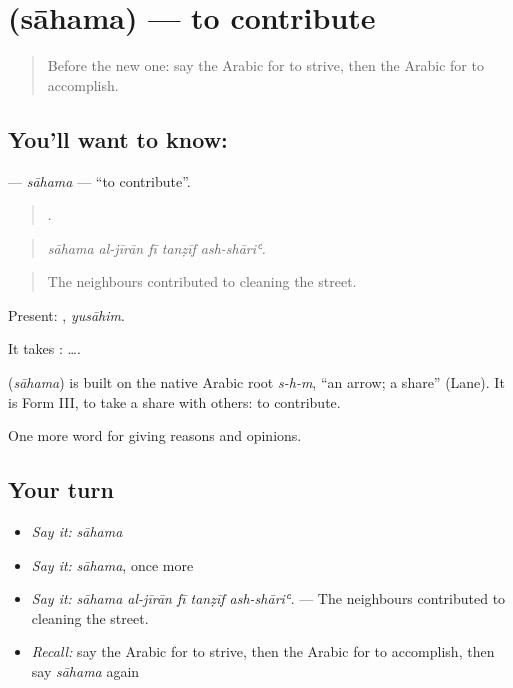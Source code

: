 \section[\texorpdfstring{\ar{ساهم} (sāhama)}{ساهم (sāhama)}]{ (sāhama) — to contribute}

\label{lesson:AR-C371-sahama}



\begin{quote}
Before the new one: say the Arabic for to strive, then the Arabic for to accomplish.
\end{quote}

\subsection*{You'll want to know: }
\textbf{} — \emph{sāhama} — \textquotedblleft{}to contribute\textquotedblright{}.

\begin{quote}
    .
\end{quote}

\begin{quote}
\emph{sāhama al-jīrān fī tanẓīf ash-shāriʿ.}
\end{quote}

\begin{quote}
The neighbours contributed to cleaning the street.
\end{quote}

Present: , \emph{yusāhim}.

It takes :   ….

\begin{cousinweb}
\textbf{} (\emph{sāhama}) is built on the native Arabic root \emph{s-h-m}, \textquotedblleft{}an arrow; a share\textquotedblright{} (Lane). It is Form III, to take a share with others: to contribute.
\end{cousinweb}

\begin{grammarlens}[title={What you've built}]
One more word for giving reasons and opinions.
\end{grammarlens}

\subsection*{Your turn}
\begin{itemize}
\raggedright
  \item \emph{Say it:} \emph{sāhama}
  \item \emph{Say it:} \emph{sāhama}, once more
  \item \emph{Say it:} \emph{sāhama al-jīrān fī tanẓīf ash-shāriʿ.} — The neighbours contributed to cleaning the street.
  \item \emph{Recall:} say the Arabic for to strive, then the Arabic for to accomplish, then say \emph{sāhama} again
\end{itemize}

